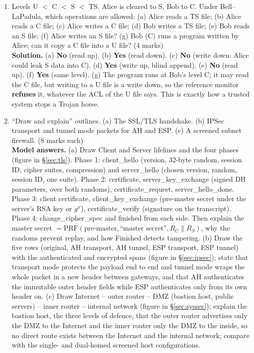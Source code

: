 \begin{enumerate}[leftmargin=1.6em,itemsep=4pt]
  \item Levels U $<$ C $<$ S $<$ TS. Alice is cleared to S, Bob to C. Under Bell--LaPadula, which operations are allowed: (a) Alice reads a TS file; (b) Alice reads a C file; (c) Alice writes a C file; (d) Bob writes a TS file; (e) Bob reads an S file; (f) Alice writes an S file? (g) Bob (C) runs a program written by Alice; can it copy a C file into a U file? \hfill (4 marks)\\
  \textbf{Solution.} (a) \textbf{No} (read up). (b) \textbf{Yes} (read down). (c) \textbf{No} (write down: Alice could leak S data into C). (d) \textbf{Yes} (write up, blind append). (e) \textbf{No} (read up). (f) \textbf{Yes} (same level). (g) The program runs at Bob's level C; it may read the C file, but writing to a U file is a write down, so the reference monitor \textbf{refuses} it, whatever the ACL of the U file says. This is exactly how a trusted system stops a Trojan horse.

  \item ``Draw and explain'' outlines. (a) The SSL/TLS handshake. (b) IPSec transport and tunnel mode packets for AH and ESP. (c) A screened subnet firewall. \hfill (8 marks each)\\
  \textbf{Model answers.} (a) Draw Client and Server lifelines and the four phases (figure in \S\ref{sec:tls}). Phase 1: client\_hello (version, 32-byte random, session ID, cipher suites, compression) and server\_hello (chosen version, random, session ID, one suite). Phase 2: certificate, server\_key\_exchange (signed DH parameters, over both randoms), certificate\_request, server\_hello\_done. Phase 3: client certificate, client\_key\_exchange (pre-master secret under the server's RSA key or $g^x$), certificate\_verify (signature on the transcript). Phase 4: change\_cipher\_spec and finished from each side. Then explain the master secret $= \mathrm{PRF}(\text{pre-master}, \text{``master secret''}, R_C \| R_S)$, why the randoms prevent replay, and how Finished detects tampering. (b) Draw the five rows (original, AH transport, AH tunnel, ESP transport, ESP tunnel) with the authenticated and encrypted spans (figure in \S\ref{sec:ipsec}); state that transport mode protects the payload end to end and tunnel mode wraps the whole packet in a new header between gateways, and that AH authenticates the immutable outer header fields while ESP authenticates only from its own header on. (c) Draw Internet -- outer router -- DMZ (bastion host, public servers) -- inner router -- internal network (figure in \S\ref{sec:syssec}); explain the bastion host, the three levels of defence, that the outer router advertises only the DMZ to the Internet and the inner router only the DMZ to the inside, so no direct route exists between the Internet and the internal network; compare with the single- and dual-homed screened host configurations.
\end{enumerate}

